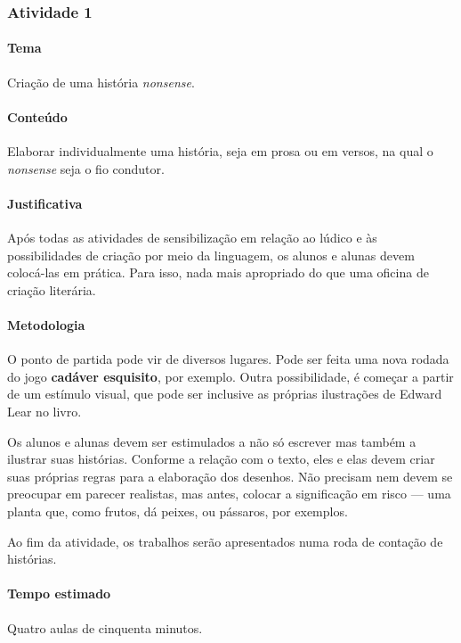 \documentclass[11pt]{extarticle}
\begin{document}
\subsubsection{Atividade 1}

\paragraph{Tema} Criação de uma história \emph{nonsense}.

\paragraph{Conteúdo} Elaborar individualmente uma história, seja em prosa ou
em versos, na qual o \emph{nonsense} seja o fio condutor. 

\paragraph{Justificativa} Após todas as atividades de sensibilização 
em relação ao lúdico e às possibilidades de criação por meio da linguagem, 
os alunos e alunas devem colocá-las em prática.
Para isso, nada mais apropriado do que uma oficina de criação literária. 


\paragraph{Metodologia} O ponto de partida pode vir de diversos lugares.
Pode ser feita uma nova rodada do jogo \textbf{cadáver esquisito},
por exemplo. Outra possibilidade, é começar a partir de um estímulo
visual, que pode ser inclusive as próprias ilustrações de Edward Lear 
no livro. 

Os alunos e alunas devem ser estimulados a não só escrever mas também a 
ilustrar suas histórias. Conforme a relação com o texto, eles e elas
devem criar suas próprias regras para a elaboração dos desenhos. 
Não precisam nem devem se preocupar em parecer realistas, 
mas antes, colocar a significação em risco --- uma planta que,
como frutos, dá  peixes, ou pássaros, por exemplos. 

Ao fim da atividade, os trabalhos serão apresentados numa roda de contação de histórias. 

\paragraph{Tempo estimado} Quatro aulas de cinquenta minutos.
\end{document}
